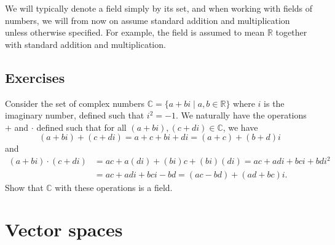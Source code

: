 We will typically denote a field simply by its set, and when working with fields of numbers, we will from now on assume standard addition and multiplication unless otherwise specified. For example, the field  is assumed to mean $ \mathbb{R} $ together with standard addition and multiplication.

\subsection*{Exercises}

\begin{exer}\label{exer:cfield}
Consider the set of complex numbers $ \mathbb{C}=\{a+bi\mid a,b\in\mathbb{R}\} $ where $ i $ is the imaginary number, defined such that $ i^2=-1 $. We naturally have the operations $ + $ and $ \cdot $ defined such that for all $ (a+bi),(c+di)\in\mathbb{C} $, we have
\begin{equation*}
    (a+bi)+(c+di)=a+c+bi+di=(a+c)+(b+d)i
\end{equation*}
and
\begin{align*}
    (a+bi)\cdot(c+di) &= ac+a(di)+(bi)c+(bi)(di)=ac+adi+bci+bdi^2 \\
    &= ac+adi+bci-bd=(ac-bd)+(ad+bc)i.
\end{align*}
Show that $ \mathbb{C} $ with these operations is a field.
\end{exer}

\section{Vector spaces}

